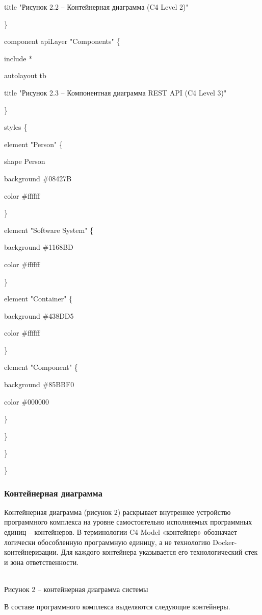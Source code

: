 \documentclass[
]{article}
\begin{document}
title "Рисунок 2.2 -- Контейнерная диаграмма (C4 Level 2)"

\}

component apiLayer "Components" \{

include *

autolayout tb

title "Рисунок 2.3 -- Компонентная диаграмма REST API (C4 Level 3)"

\}

styles \{

element "Person" \{

shape Person

background \#08427B

color \#ffffff

\}

element "Software System" \{

background \#1168BD

color \#ffffff

\}

element "Container" \{

background \#438DD5

color \#ffffff

\}

element "Component" \{

background \#85BBF0

color \#000000

\}

\}

\}

\}

\subsubsection{Контейнерная
диаграмма}\label{ux43aux43eux43dux442ux435ux439ux43dux435ux440ux43dux430ux44f-ux434ux438ux430ux433ux440ux430ux43cux43cux430}

Контейнерная диаграмма (рисунок 2) раскрывает внутреннее устройство
программного комплекса на уровне самостоятельно исполняемых программных
единиц -- контейнеров. В терминологии C4 Model «контейнер» обозначает
логически обособленную программную единицу, а не технологию
Docker-контейнеризации. Для каждого контейнера указывается его
технологический стек и зона ответственности.

\\
Рисунок 2 -- контейнерная диаграмма системы

В составе программного комплекса выделяются следующие контейнеры.
\end{document}
